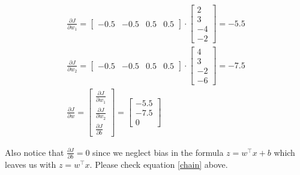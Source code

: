 \documentclass{article}
\begin{document}
\begin{equation}
\begin{gathered}
            \frac{\partial J}{\partial w_1} = 
                \begin{bmatrix}
                -0.5  &  -0.5  & 0.5  & 0.5            
                \end{bmatrix} \cdot
                \begin{bmatrix}
                2 \\  3  \\ -4  \\ -2            
                \end{bmatrix}
                =
                -5.5
            \\
            \frac{\partial J}{\partial w_2} = 
                \begin{bmatrix}
                -0.5  &  -0.5  & 0.5  & 0.5            
                \end{bmatrix} \cdot
                \begin{bmatrix}
                4  \\  3  \\ -2  \\ -6            
                \end{bmatrix}
                =
                -7.5
            \\
            \frac{\partial J}{\partial w} = 
            \begin{bmatrix}
                \frac{\partial J}{\partial w_1} \\[6pt]
                \frac{\partial J}{\partial w_2} \\[6pt]
                \frac{\partial J}{\partial b} 
            \end{bmatrix}
            =
            \begin{bmatrix}
            -5.5 \\[6pt]  -7.5  \\[6pt] 0         
            \end{bmatrix}
     \end{gathered}
\end{equation}

Also notice that $\frac{\partial J}{\partial b} = 0$  since we neglect bias in the formula $z = w^{\intercal} x + b$ which leaves us with $z = w^{\intercal} x$. Please check equation \ref{chain} above.\\
\end{document}
